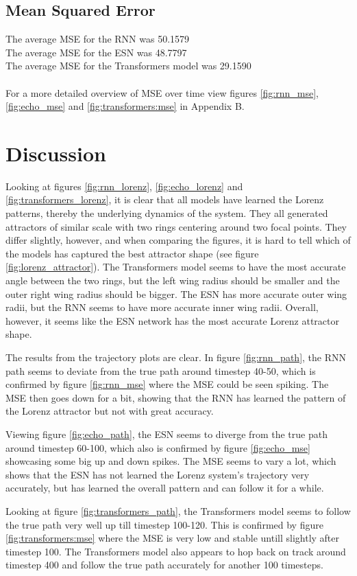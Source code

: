 \documentclass[11pt]{article}
\begin{document}
\subsection{Mean Squared Error}
The average MSE for the RNN was 50.1579 \\
The average MSE for the ESN was 48.7797 \\
The average MSE for the Transformers model was 29.1590 \\ \\
For a more detailed overview of MSE over time view figures \ref{fig:rnn_mse}, \ref{fig:echo_mse} and \ref{fig:transformers:mse} in Appendix B.

\section{Discussion}
Looking at figures \ref{fig:rnn_lorenz}, \ref{fig:echo_lorenz} and \ref{fig:transformers_lorenz}, it is clear that all models have learned the Lorenz patterns, thereby the underlying dynamics of the system. They all generated attractors of similar scale with two rings centering around two focal points. They differ slightly, however, and when comparing the figures, it is hard to tell which of the models has captured the best attractor shape (see figure \ref{fig:lorenz_attractor}). The Transformers model seems to have the most accurate angle between the two rings, but the left wing radius should be smaller and the outer right wing radius should be bigger. The ESN has more accurate outer wing radii, but the RNN seems to have more accurate inner wing radii. Overall, however, it seems like the ESN network has the most accurate Lorenz attractor shape.


The results from the trajectory plots are clear. In figure \ref{fig:rnn_path}, the RNN path seems to deviate from the true path around timestep 40-50, which is confirmed by figure \ref{fig:rnn_mse} where the MSE could be seen spiking. The MSE then goes down for a bit, showing that the RNN has learned the pattern of the Lorenz attractor but not with great accuracy.

Viewing figure \ref{fig:echo_path}, the ESN seems to diverge from the true path around timestep 60-100, which also is confirmed by figure \ref{fig:echo_mse} showcasing some big up and down spikes. The MSE seems to vary a lot, which shows that the ESN has not learned the Lorenz system's trajectory very accurately, but has learned the overall pattern and can follow it for a while.

Looking at figure \ref{fig:transformers_path}, the Transformers model seems to follow the true path very well up till timestep 100-120. This is confirmed by figure \ref{fig:transformers:mse} where the MSE is very low and stable untill slightly after timestep 100. The Transformers model also appears to hop back on track around timestep 400 and follow the true path accurately for another 100 timesteps.
\end{document}
